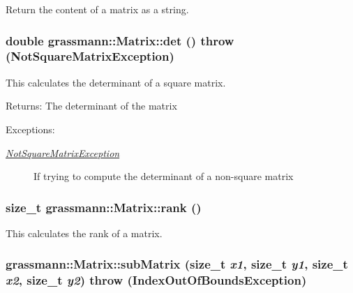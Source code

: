 Return the content of a matrix as a string. 

\hypertarget{classgrassmann_1_1Matrix_a58061567820df67c680f197118ddc56}{
\subsubsection[det]{\setlength{\rightskip}{0pt plus 5cm}double grassmann::Matrix::det ()  throw ({\bf NotSquareMatrixException})}}
\label{classgrassmann_1_1Matrix_a58061567820df67c680f197118ddc56}


This calculates the determinant of a square matrix. 

\begin{Desc}
\item[Returns:]The determinant of the matrix \end{Desc}
\begin{Desc}
\item[Exceptions:]
\begin{description}
\item[{\em \hyperlink{classgrassmann_1_1NotSquareMatrixException}{NotSquareMatrixException}}]If trying to compute the determinant of a non-square matrix \end{description}
\end{Desc}
\hypertarget{classgrassmann_1_1Matrix_6eb4516b1eba6ede777894c17e0fa39f}{
\subsubsection[rank]{\setlength{\rightskip}{0pt plus 5cm}size\_\-t grassmann::Matrix::rank ()}}
\label{classgrassmann_1_1Matrix_6eb4516b1eba6ede777894c17e0fa39f}


This calculates the rank of a matrix. 

\hypertarget{classgrassmann_1_1Matrix_2c50f5fdf0de71774883225c1caaf9b9}{
\subsubsection[subMatrix]{ grassmann::Matrix::subMatrix (size\_\-t {\em x1}, \/  size\_\-t {\em y1}, \/  size\_\-t {\em x2}, \/  size\_\-t {\em y2})  throw ({\bf IndexOutOfBoundsException})}}
\label{classgrassmann_1_1Matrix_2c50f5fdf0de71774883225c1caaf9b9}


